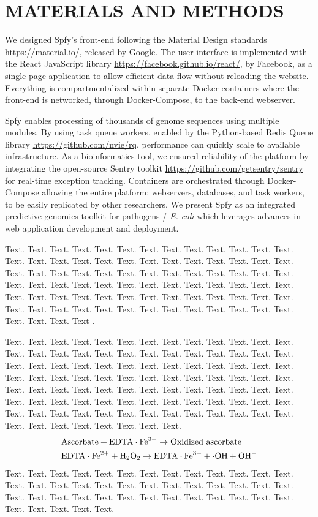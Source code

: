 \documentclass[a4,center,fleqn]{NAR}
\begin{document}
\section{MATERIALS AND METHODS}
We designed Spfy's front-end following the Material Design standards \url{https://material.io/}, released by Google.
The user interface is implemented with the React JavaScript library \url{https://facebook.github.io/react/}, by Facebook, as a single-page application to allow efficient data-flow without reloading the website.
Everything is compartmentalized within separate Docker containers where the front-end is networked, through Docker-Compose, to the back-end webserver.

Spfy enables processing of thousands of genome sequences using multiple modules.
By using task queue workers, enabled by the Python-based Redis Queue library \url{https://github.com/nvie/rq}, performance can quickly scale to available infrastructure.
As a bioinformatics tool, we ensured reliability of the platform by integrating the open-source Sentry toolkit \url{https://github.com/getsentry/sentry} for real-time exception tracking.
Containers are orchestrated through Docker-Compose allowing the entire platform: webservers, databases, and task workers, to be easily replicated by other researchers.
We present Spfy as an integrated predictive genomics toolkit for pathogens / \textit{E. coli} which leverages advances in web application development and deployment.

Text. Text. Text. Text. Text. Text. Text. Text. Text. Text. Text.
Text. Text. Text. Text. Text. Text. Text. Text. Text. Text. Text.
Text. Text. Text. Text. Text. Text. Text. Text. Text. Text. Text.
Text. Text. Text. Text. Text. Text. Text. Text. Text. Text. Text.
Text. Text. Text. Text. Text. Text. Text. Text. Text. Text. Text.
Text. Text. Text. Text. Text. Text. Text. Text. Text. Text. Text.
Text. Text. Text. Text. Text. Text. Text. Text. Text. Text. Text.
Text. Text. Text{}. Text.
Text \cite{1}.

Text. Text. Text. Text. Text. Text. Text. Text. Text. Text. Text.
Text. Text. Text. Text. Text. Text. Text. Text. Text. Text. Text.
Text. Text. Text. Text. Text. Text. Text. Text. Text. Text. Text.
Text. Text. Text. Text. Text. Text. Text. Text. Text. Text. Text.
Text. Text. Text. Text. Text. Text. Text. Text. Text. Text. Text.
Text. Text. Text. Text. Text. Text. Text. Text. Text. Text. Text.
Text. Text. Text. Text. Text. Text. Text. Text. Text. Text. Text.
Text. Text. Text. Text. Text. Text. Text. Text. Text. Text. Text.
Text. Text. Text. Text. Text. Text. Text. Text. Text. Text. Text.
\begin{align*}
&\mathrm{Ascorbate} + \mathrm{EDTA} \cdot \mathrm{Fe}^{3+} \to
\hbox{Oxidized ascorbate}
\\
&\mathrm{EDTA} \cdot \mathrm{Fe}^{2+} + \mathrm{H}_2
\mathrm{O}_2 \to
\mathrm{EDTA} \cdot \mathrm{Fe}^{3+} + \cdot
\mathrm{OH} + \mathrm{OH}^-
\end{align*}
Text. Text. Text. Text. Text. Text. Text. Text. Text. Text. Text.
Text. Text. Text. Text. Text. Text. Text. Text. Text. Text. Text.
Text. Text. Text. Text. Text. Text. Text. Text. Text. Text. Text.
Text. Text. Text. Text. Text. Text. Text. Text. Text. Text. Text.
\end{document}
